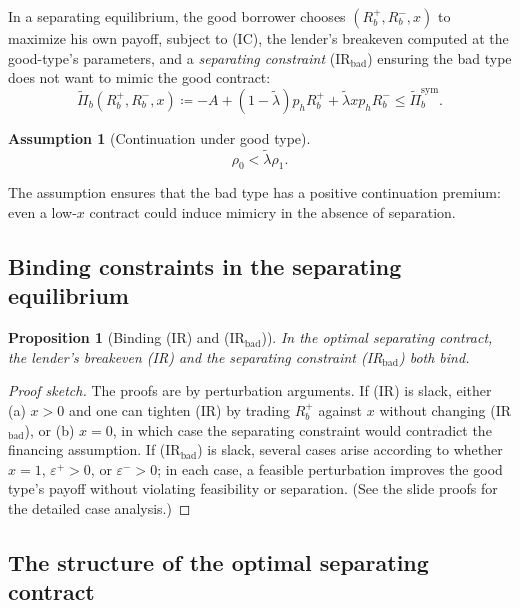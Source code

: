 \documentclass[11pt,a4paper,oneside]{book}
\def\leq{\leqslant}
\theoremstyle{plain}
\newtheorem{proposition}[theorem]{Proposition}
\theoremstyle{definition}
\newtheorem{assumption}[theorem]{Assumption}
\theoremstyle{remark}
\numberwithin{equation}{chapter}
\begin{document}
In a separating equilibrium, the good borrower chooses $(R_b^+, R_b^-, x)$ to maximize his own payoff, subject to (IC), the lender's breakeven computed at the good-type's parameters, and a \emph{separating constraint} (IR$_{\text{bad}}$) ensuring the bad type does not want to mimic the good contract:
\begin{equation*}
  \widetilde{\Pi}_b(R_b^+, R_b^-, x) \coloneqq -A + (1 - \widetilde{\lambda}) p_h R_b^+ + \widetilde{\lambda} x p_h R_b^- \leq \widetilde{\Pi}_b^{\text{sym}}.
\end{equation*}

\begin{assumption}[Continuation under good type]\label{ass:diss-short-sep-viable}
\begin{equation*}
  \rho_0 < \widetilde{\lambda} \rho_1.
\end{equation*}
\end{assumption}

The assumption ensures that the bad type has a positive continuation premium: even a low-$x$ contract could induce mimicry in the absence of separation.

\subsection{Binding constraints in the separating equilibrium}

\begin{proposition}[Binding (IR) and (IR$_{\text{bad}}$)]\label{prop:diss-short-binding}
In the optimal separating contract, the lender's breakeven (IR) and the separating constraint (IR$_{\text{bad}}$) both bind.
\end{proposition}

\begin{proof}[Proof sketch]
The proofs are by perturbation arguments.
If (IR) is slack, either (a) $x > 0$ and one can tighten (IR) by trading $R_b^+$ against $x$ without changing (IR$_{\text{bad}}$), or (b) $x = 0$, in which case the separating constraint would contradict the financing assumption.
If (IR$_{\text{bad}}$) is slack, several cases arise according to whether $x = 1$, $\varepsilon^+ > 0$, or $\varepsilon^- > 0$; in each case, a feasible perturbation improves the good type's payoff without violating feasibility or separation.
(See the slide proofs for the detailed case analysis.)
\end{proof}

\subsection{The structure of the optimal separating contract}
\end{document}
